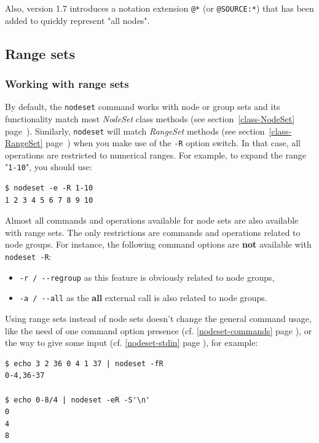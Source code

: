 \documentclass[english,a4paper]{csuserguide}
\newcommand{\NodeSet}{\textit{NodeSet}\xspace}
\newcommand{\nodeset}{\texttt{nodeset}\xspace}
\begin{document}
Also, version 1.7 introduces a notation extension \verb+@*+ (or \verb+@SOURCE:*+) that has been added to quickly represent "all nodes".

\subsection{Range sets}
\label{nodeset-rangeset}

\subsubsection{Working with range sets}
By default, the \nodeset command works with node or group sets and its functionality match most \NodeSet class methods (see section~\ref{class-NodeSet} page~\pageref{class-NodeSet}). Similarly, \nodeset will match \textit{RangeSet} methods (see section~\ref{class-RangeSet} page~\pageref{class-RangeSet}) when you make use of the \verb+-R+ option switch. In that case, all operations are restricted to numerical ranges. For example, to expand the range "\verb+1-10+", you should use:

\medskip
\begin{lstlisting}[breaklines=true, breakatwhitespace=true]
$ nodeset -e -R 1-10
1 2 3 4 5 6 7 8 9 10
\end{lstlisting}

Almost all commands and operations available for node sets are also available with range sets. The only restrictions are commands and operations related to node groups. For instance, the following command options are \textbf{not} available with \lstinline+nodeset -R+:
\begin{itemize}
\item{\verb+-r / --regroup+ as this feature is obviously related to node groups,}
\item{\verb+-a / --all+ as the \textbf{all} external call is also related to node groups.}
\end{itemize}

\pagebreak[4]

Using range sets instead of node sets doesn't change the general command usage, like the need of one command option presence (cf. \ref{nodeset-commands} page \pageref{nodeset-commands}), or the way to give some input (cf. \ref{nodeset-stdin} page \pageref{nodeset-stdin}), for example:
\medskip
\begin{lstlisting}[breaklines=true, breakatwhitespace=true]
$ echo 3 2 36 0 4 1 37 | nodeset -fR
0-4,36-37

$ echo 0-8/4 | nodeset -eR -S'\n'
0
4
8
\end{lstlisting}
\end{document}
